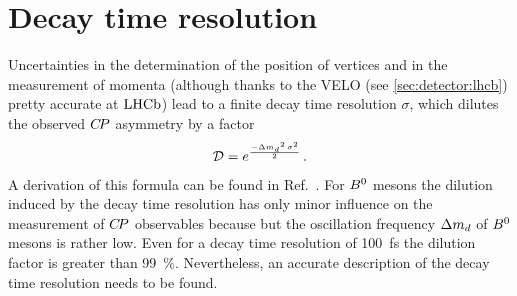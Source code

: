 \section{Decay time resolution}
\label{sec:dataanalysis::resolution}

Uncertainties in the determination of the position of vertices and in the
measurement of momenta (although thanks to the VELO (see
\cref{sec:detector:lhcb}) pretty accurate  at $\mbox{LHCb}$) lead to a finite decay
time resolution $\sigma$, which dilutes the observed ${C\!P}$ asymmetry by a
factor
%
\begin{align}
  \mathcal{D} = e^{\frac{-{\Delta m_{{d}}}^2\,\sigma^2}{2}} \, .
\end{align}
%
A derivation of this formula can be found in Ref.~\cite{LHCb-ANA-2011-001}.
For ${{B}^0}$ mesons the dilution induced by the decay time resolution has only
minor influence on the measurement of ${C\!P}$ observables because but the
oscillation frequency ${\Delta m_{{d}}}$ of ${{B}^0}$ mesons is rather low. Even for a decay
time resolution of \SI{100}{\fs} the dilution factor is greater than
\SI{99}{\percent}. Nevertheless, an accurate description of the decay time
resolution needs to be found.